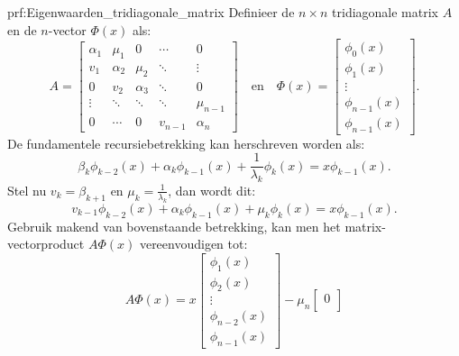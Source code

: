 \begin{prf}{prf:Eigenwaarden_tridiagonale_matrix}  
    Definieer de $n \times n$ tridiagonale matrix $A$ en de $n$-vector $\Phi(x)$ als:
    \begin{equation*}
        A = \begin{bmatrix}
            \alpha_1 & \mu_1 & 0 & \cdots & 0 \\
            v_1 & \alpha_2 & \mu_2 & \ddots & \vdots \\
            0 & v_2 & \alpha_3 & \ddots & 0 \\
            \vdots & \ddots & \ddots & \ddots & \mu_{n-1} \\
            0 & \cdots & 0 & v_{n-1} & \alpha_n
        \end{bmatrix}
        \quad \text{en} \quad
        \Phi(x) = \begin{bmatrix}
            \phi_0(x) \\
            \phi_1(x) \\
            \vdots \\
            \phi_{n-1}(x) \\
            \phi_{n-1}(x)
        \end{bmatrix}.
    \end{equation*}
    De fundamentele recursiebetrekking kan herschreven worden als:
    \begin{equation*}
        \beta_k\phi_{k-2}(x) + \alpha_k\phi_{k-1}(x) + \frac{1}{\lambda_k}\phi_k(x) = x\phi_{k-1}(x).
    \end{equation*}
    Stel nu $v_k = \beta_{k+1}$ en $\mu_k = \frac{1}{\lambda_k}$, dan wordt dit:
    \begin{equation*}
        v_{k-1}\phi_{k-2}(x) + \alpha_k\phi_{k-1}(x) + \mu_k\phi_k(x) = x\phi_{k-1}(x).
    \end{equation*}
    Gebruik makend van bovenstaande betrekking, kan men het matrix-vectorproduct $A\Phi(x)$ vereenvoudigen tot:
    \begin{equation*}
        A\Phi(x) = x\begin{bmatrix}
            \phi_1(x) \\
            \phi_2(x) \\
            \vdots \\
            \phi_{n-2}(x) \\
            \phi_{n-1}(x) 
        \end{bmatrix}
        - \mu_n\begin{bmatrix}
            0 \\

\end{bmatrix}
\end{equation*}
\end{prf}
